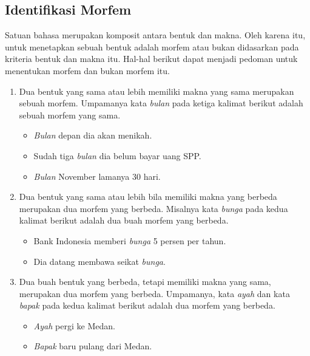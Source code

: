 \subsection{Identifikasi Morfem}
\label{sec:identifikasiMorfem}

Satuan bahasa merupakan komposit antara bentuk dan makna\cite{chaer:08:morfologi}. Oleh karena itu, untuk menetapkan sebuah bentuk adalah morfem atau bukan didasarkan pada kriteria bentuk dan makna itu. Hal-hal berikut dapat menjadi pedoman untuk menentukan morfem dan bukan morfem itu. 

\begin{enumerate}
	\item Dua bentuk yang sama atau lebih memiliki makna yang sama merupakan sebuah morfem. Umpamanya kata \textit{bulan} pada ketiga kalimat berikut adalah sebuah morfem yang sama.
	\begin{itemize}
		\item \textit{Bulan} depan dia akan menikah.
		\item Sudah tiga \textit{bulan} dia belum bayar uang SPP.
		\item \textit{Bulan} November lamanya 30 hari.
	\end{itemize}
	
	\item Dua bentuk yang sama atau lebih bila memiliki makna yang berbeda merupakan dua morfem yang berbeda. Misalnya kata \textit{bunga} pada kedua kalimat berikut adalah dua buah morfem yang berbeda.
	\begin{itemize}
		\item Bank Indonesia memberi \textit{bunga} 5 persen per tahun.
		\item Dia datang membawa seikat \textit{bunga}.
	\end{itemize}
	
	\item Dua buah bentuk yang berbeda, tetapi memiliki makna yang sama, merupakan dua morfem yang berbeda. Umpamanya, kata \textit{ayah} dan kata \textit{bapak} pada kedua kalimat berikut adalah dua morfem yang berbeda.
	\begin{itemize}
		\item \textit{Ayah} pergi ke Medan.
		\item \textit{Bapak} baru pulang dari Medan.
	\end{itemize}
	

\end{enumerate}
